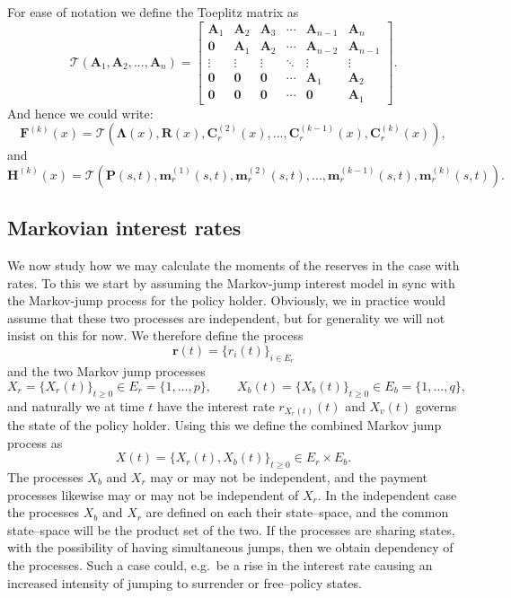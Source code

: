 \documentclass[
]{book}
\begin{document}
For ease of notation we define the Toeplitz matrix as
\[
\mathcal T(\mathbf A_1,\mathbf A_2,...,\mathbf A_n)=
\begin{bmatrix}
\mathbf A_1 & \mathbf A_2 & \mathbf A_3 & \cdots & \mathbf A_{n-1} & \mathbf A_n\\
\mathbf 0 & \mathbf A_1 & \mathbf A_2 & \cdots & \mathbf A_{n-2} & \mathbf A_{n-1}\\
\vdots & \vdots & \vdots & \ddots & \vdots & \vdots \\
\mathbf 0 & \mathbf 0 & \mathbf 0 & \cdots & \mathbf A_1 & \mathbf A_2\\
\mathbf 0 & \mathbf 0 & \mathbf 0 & \cdots & \mathbf 0 & \mathbf A_1
\end{bmatrix}.
\]
And hence we could write:
\[
\mathbf F^{(k)}(x)=\mathcal T(\mathbf \Lambda(x), \mathbf R(x) , \mathbf C^{(2)}_r(x) , ... , \mathbf C^{(k-1)}_r(x), \mathbf C^{(k)}_r(x)),
\]
and
\[
\mathbf H^{(k)}(x)=\mathcal T(\mathbf P(s,t) , \mathbf m_r^{(1)}(s,t) , \mathbf m_r^{(2)}(s,t), ...,\mathbf m_r^{(k-1)}(s,t) , \mathbf m_r^{(k)}(s,t)).
\]

\hypertarget{markovian-interest-rates}{%
\subsection{Markovian interest rates}\label{markovian-interest-rates}}

We now study how we may calculate the moments of the reserves in the case with rates. To this we start by assuming the Markov-jump interest model in sync with the Markov-jump process for the policy holder. Obviously, we in practice would assume that these two processes are independent, but for generality we will not insist on this for now. We therefore define the process
\[
\mathbf r(t)=\{r_i(t)\}_{i\in E_r}
\]
and the two Markov jump processes
\[
X_r=\{X_r(t)\}_{t\ge 0}\in E_r=\{1,...,p\},\qquad X_b(t)=\{X_b(t)\}_{t\ge 0}\in E_b=\{1,...,q\},
\]
and naturally we at time \(t\) have the interest rate \(r_{X_r(t)}(t)\) and \(X_v(t)\) governs the state of the policy holder. Using this we define the combined Markov jump process as
\[
X(t)=\{X_r(t),X_b(t)\}_{t\ge 0}\in E_r\times E_b.
\]
The processes \(X_b\) and \(X_r\) may or may not be independent, and the payment processes likewise may or may not be independent of \(X_r\). In the independent case the processes \(X_b\) and \(X_r\) are defined on each their state--space, and the common state--space will be the product set of the two. If the processes are sharing states, with the possibility of having simultaneous jumps, then we obtain dependency of the processes. Such a case could, e.g.~be a rise in the interest rate causing an increased intensity of jumping to surrender or free--policy states.
\end{document}
